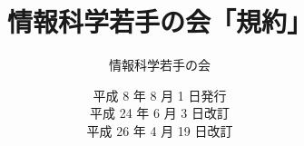 %
%
%
%
\makeatletter
\def\labelenumi{第\theenumi 章　}
\def\theenumii{\arabic{enumii}}
\def\p@enumii{}
\def\labelenumii{第\theenumii 条　}
\def\theenumiii{\arabic{enumiii}}
\def\labelenumiii{\theenumiii　}
\def\p@enumiii{}
\makeatother
%
\def\@maketitle{
 \@title
 \@author
 \@date
 \vspace*{5cm}
}
\title{\Huge 情報科学若手の会「規約」}
\author{\huge 情報科学若手の会}
\date{\LARGE 平成   8 年  8 月   1 日発行\\
                         平成 24 年  6 月   3 日改訂\\
                         平成 26 年  4 月 19 日改訂}

